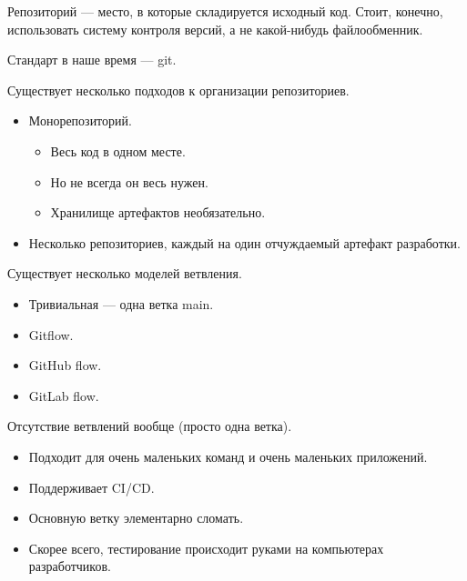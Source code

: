     \begin{Rem}
        Репозиторий --- место, в которые складируется исходный код. Стоит, конечно, использовать систему контроля версий, а не какой-нибудь файлообменник. 

        Стандарт в наше время --- git.
    \end{Rem}

    \begin{Rem}
        Существует несколько подходов к организации репозиториев.
        \begin{itemize}
            \item Монорепозиторий.
            \begin{itemize}
                \item Весь код в одном месте.
                \item Но не всегда он весь нужен.
                \item Хранилище артефактов необязательно.
            \end{itemize}
            \item Несколько репозиториев, каждый на один отчуждаемый артефакт разработки.
        \end{itemize}
    \end{Rem}

    \begin{Rem}
        Существует несколько моделей ветвления.
        \begin{itemize}
            \item Тривиальная --- одна ветка main.
            \item Gitflow.
            \item GitHub flow.
            \item GitLab flow.
        \end{itemize}
    \end{Rem}

    \begin{Rem}
        Отсутствие ветвлений вообще (просто одна ветка).
        \begin{itemize}
            \item Подходит для очень маленьких команд и очень маленьких приложений.
            \item Поддерживает CI/CD.
            \item Основную ветку элементарно сломать.
            \item Скорее всего, тестирование происходит руками на компьютерах разработчиков.
        \end{itemize}
    \end{Rem}

